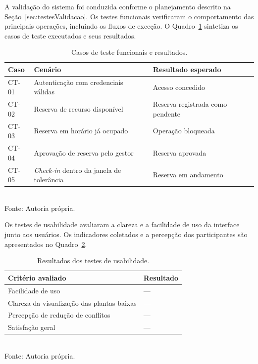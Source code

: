 A validação do sistema foi conduzida conforme o planejamento descrito na Seção~\ref{sec:testesValidacao}. Os testes funcionais verificaram o comportamento das principais operações, incluindo os fluxos de exceção. O Quadro~\ref{quadro:testes-funcionais} sintetiza os casos de teste executados e seus resultados.

\begin{table}[H]
  \centering
  \caption{Casos de teste funcionais e resultados.}
  \label{quadro:testes-funcionais}
  \begin{tabular}{|p{1.6cm}|p{6cm}|p{4.5cm}|}
    \hline
    \textbf{Caso} & \textbf{Cenário} & \textbf{Resultado esperado} \\
    \hline
    CT-01 & Autenticação com credenciais válidas & Acesso concedido \\
    \hline
    CT-02 & Reserva de recurso disponível & Reserva registrada como pendente \\
    \hline
    CT-03 & Reserva em horário já ocupado & Operação bloqueada \\
    \hline
    CT-04 & Aprovação de reserva pelo gestor & Reserva aprovada \\
    \hline
    CT-05 & \textit{Check-in} dentro da janela de tolerância & Reserva em andamento \\
    \hline
  \end{tabular}\\
  {\footnotesize Fonte: Autoria própria.}
\end{table}

Os testes de usabilidade avaliaram a clareza e a facilidade de uso da interface junto aos usuários. Os indicadores coletados e a percepção dos participantes são apresentados no Quadro~\ref{quadro:testes-usabilidade}. %

\begin{table}[H]
  \centering
  \caption{Resultados dos testes de usabilidade.}
  \label{quadro:testes-usabilidade}
  \begin{tabular}{|p{8cm}|p{3.5cm}|}
    \hline
    \textbf{Critério avaliado} & \textbf{Resultado} \\
    \hline
    Facilidade de uso & --- \\
    \hline
    Clareza da visualização das plantas baixas & --- \\
    \hline
    Percepção de redução de conflitos & --- \\
    \hline
    Satisfação geral & --- \\
    \hline
  \end{tabular}\\
  {\footnotesize Fonte: Autoria própria.}
\end{table}

